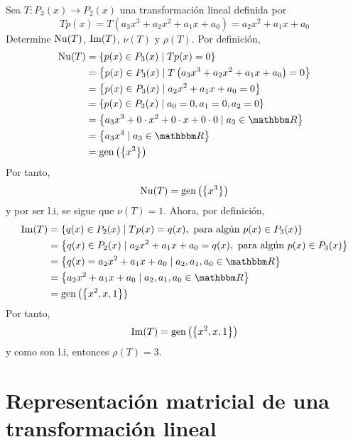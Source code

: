 \begin{example}
    Sea $T: P_3(x) \longrightarrow P_2(x)$ una transformación lineal definida por
    $$Tp(x) = T \left( a_3x^3 + a_2x^2 + a_1x + a_0 \right) = a_2x^2 + a_1x + a_0$$
    Determine $\operatorname{Nu}(T)$, $\operatorname{Im}(T)$, $\nu(T)$ y $\rho(T)$. \newpage
    \solucion Por definición,
    \begin{align*}
        \Nuc(T) & = \left\{ p(x) \in P_3(x) \mid Tp(x) = 0 \right\} \\
        & = \left\{ p(x) \in P_3(x) \mid T \left( a_3x^3 + a_2x^2 + a_1x + a_0 \right) = 0 \right\} \\
        & = \left\{ p(x) \in P_3(x) \mid a_2x^2 + a_1x + a_0 = 0 \right\} \\
        & = \left\{ p(x) \in P_3(x) \mid a_0 = 0,  a_1 = 0,  a_2 = 0 \right\} \\
        & = \left\{ a_3x^3 + 0 \cdot x^2 + 0 \cdot x + 0 \cdot 0 \mid a_3 \in \RR \right\} \\
        & = \left\{ a_3x^3 \mid a_3 \in \RR \right\} \\
        & = \Gen \left( \left\{ x^3 \right\} \right)
    \end{align*}
    Por tanto,
    $$\operatorname{Nu}(T) = \operatorname{gen} \left( \left\{ x^3 \right\} \right)$$
    y por ser l.i, se sigue que $\nu(T) = 1$. Ahora, por definición,
    \begin{align*}
        \Ima(T) & = \left\{ q(x) \in P_2(x) \mid Tp(x) = q(x), \text{ para algún } p(x) \in P_3(x) \right\} \\
        & = \left\{ q(x) \in P_2(x) \mid a_2x^2 + a_1x + a_0 = q(x), \text{ para algún } p(x) \in P_3(x) \right\} \\
        & = \left\{ q(x) = a_2x^2 + a_1x + a_0 \mid a_2,  a_1,  a_0 \in \RR \right\} \\
        & = \left\{ a_2x^2 + a_1x + a_0 \mid a_2,  a_1,  a_0 \in \RR \right\} \\
        & = \Gen \left( \left\{ x^2,  x,  1 \right\} \right)
    \end{align*}
    Por tanto,
    $$\operatorname{Im}(T) = \operatorname{gen} \left( \left\{ x^2,  x,  1 \right\} \right)$$
    y como son l.i, entonces $\rho(T) = 3$.
\end{example}

\section{Representación matricial de una transformación lineal}

